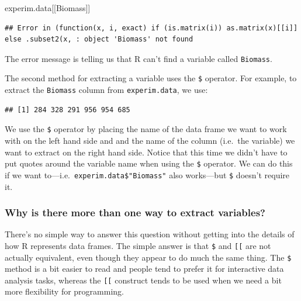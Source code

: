 \documentclass[
]{book}
\newenvironment{Shaded}{\begin{snugshade}}{\end{snugshade}}
\newcommand{\NormalTok}[1]{#1}
\newcommand{\SpecialCharTok}[1]{\textcolor[rgb]{0.00,0.00,0.00}{#1}}
\newenvironment{greybox}{
  \definecolor{shadecolor}{rgb}{0.95,0.95,0.95}  %
  \color{black}
  \begin{shaded}}
 {\end{shaded}}
\newenvironment{infobox}[1]
  {
  \begin{itemize}
  \renewcommand{\labelitemi}{
    \raisebox{-.7\height}[0pt][0pt]{
      {\setkeys{Gin}{width=3em,keepaspectratio}
        \texttt{[image: images/\#1]}}
    }
  }
  \setlength{\fboxsep}{1em}
  \begin{greybox}
  \item
  }
  {
  \end{greybox}
  \end{itemize}
  }
\begin{document}
\begin{Shaded}
\begin{Highlighting}[]
\NormalTok{experim.data[[Biomass]]}
\end{Highlighting}
\end{Shaded}

\begin{verbatim}
## Error in (function(x, i, exact) if (is.matrix(i)) as.matrix(x)[[i]] else .subset2(x, : object 'Biomass' not found
\end{verbatim}

The error message is telling us that R can't find a variable called \texttt{Biomass}.

The second method for extracting a variable uses the \texttt{\$} operator. For example, to extract the \texttt{Biomass} column from \texttt{experim.data}, we use:

\begin{Shaded}
\end{Shaded}

\begin{verbatim}
## [1] 284 328 291 956 954 685
\end{verbatim}

We use the \texttt{\$} operator by placing the name of the data frame we want to work with on the left hand side and and the name of the column (i.e.~the variable) we want to extract on the right hand side. Notice that this time we didn't have to put quotes around the variable name when using the \texttt{\$} operator. We can do this if we want to---i.e.~\texttt{experim.data\$"Biomass"} also works---but \texttt{\$} doesn't require it.

\begin{infobox}{warning}

\hypertarget{why-is-there-more-than-one-way-to-extract-variables}{%
\subsubsection*{Why is there more than one way to extract variables?}\label{why-is-there-more-than-one-way-to-extract-variables}}

There's no simple way to answer this question without getting into the details of how R represents data frames. The simple answer is that \texttt{\$} and \texttt{{[}{[}} are not actually equivalent, even though they appear to do much the same thing. The \texttt{\$} method is a bit easier to read and people tend to prefer it for interactive data analysis tasks, whereas the \texttt{{[}{[}} construct tends to be used when we need a bit more flexibility for programming.

\end{infobox}
\end{document}
